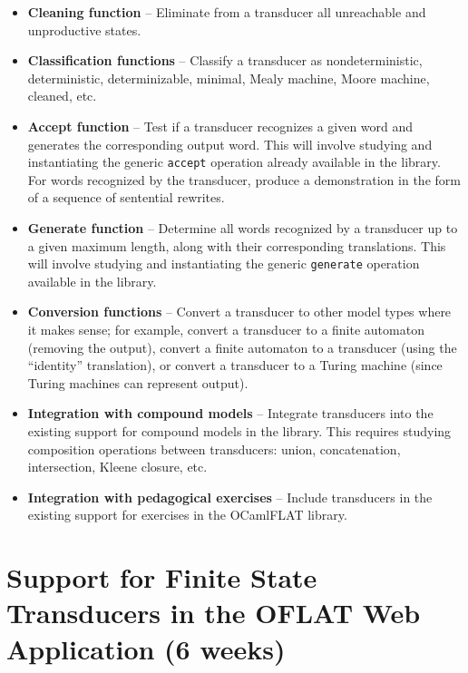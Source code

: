 \begin{itemize}
    \item \textbf{Cleaning function} -- Eliminate from a transducer all unreachable and unproductive states.

    \item \textbf{Classification functions} -- Classify a transducer as nondeterministic, deterministic, determinizable, minimal, Mealy machine, Moore machine, cleaned, etc.

    \item \textbf{Accept function} -- Test if a transducer recognizes a given word and generates the corresponding output word. This will involve studying and instantiating the generic \texttt{accept} operation already available in the library. For words recognized by the transducer, produce a demonstration in the form of a sequence of sentential rewrites.

    \item \textbf{Generate function} -- Determine all words recognized by a transducer up to a given maximum length, along with their corresponding translations. This will involve studying and instantiating the generic \texttt{generate} operation available in the library.

    \item \textbf{Conversion functions} -- Convert a transducer to other model types where it makes sense; for example, convert a transducer to a finite automaton (removing the output), convert a finite automaton to a transducer (using the ``identity'' translation), or convert a transducer to a Turing machine (since Turing machines can represent output).

    \item \textbf{Integration with compound models} -- Integrate transducers into the existing support for compound models in the library. This requires studying composition operations between transducers: union, concatenation, intersection, Kleene closure, etc.

    \item \textbf{Integration with pedagogical exercises} -- Include transducers in the existing support for exercises in the OCamlFLAT library.
\end{itemize}

\section{Support for Finite State Transducers in the OFLAT Web Application (6 weeks)}


